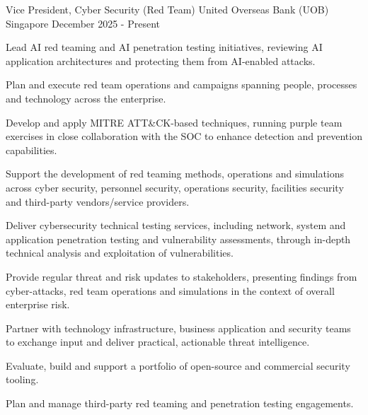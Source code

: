 

\begin{cventries}
  \cventry
    {Vice President, Cyber Security (Red Team)} %
    {United Overseas Bank (UOB)} %
    {Singapore} %
    {December 2025 - Present} %
    {
      \begin{cvitems} %
      \item{Lead AI red teaming and AI penetration testing initiatives, reviewing AI application architectures and protecting them from AI-enabled attacks.}
        \item{Plan and execute red team operations and campaigns spanning people, processes and technology across the enterprise.}
        \item{Develop and apply MITRE ATT\&CK-based techniques, running purple team exercises in close collaboration with the SOC to enhance detection and prevention capabilities.}
        \item{Support the development of red teaming methods, operations and simulations across cyber security, personnel security, operations security, facilities security and third-party vendors/service providers.}
        \item{Deliver cybersecurity technical testing services, including network, system and application penetration testing and vulnerability assessments, through in-depth technical analysis and exploitation of vulnerabilities.}
        \item{Provide regular threat and risk updates to stakeholders, presenting findings from cyber-attacks, red team operations and simulations in the context of overall enterprise risk.}
        \item{Partner with technology infrastructure, business application and security teams to exchange input and deliver practical, actionable threat intelligence.}
        \item{Evaluate, build and support a portfolio of open-source and commercial security tooling.}
        \item{Plan and manage third-party red teaming and penetration testing engagements.}
      \end{cvitems}
    }
 


\end{cventries}
